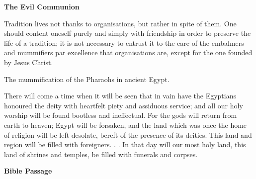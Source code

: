 \textbf{The Evil Communion}

\begin{quotex}
Tradition lives not thanks to organisations, but rather in spite of them. One should content oneself purely and simply with friendship in order to preserve the life of a tradition; it is not necessary to entrust it to the care of the embalmers and mummifiers par excellence that organisations are, except for the one founded by Jesus Christ.

\end{quotex}
The mummification of the Pharaohs in ancient Egypt.

\begin{quotex}
There will come a time when it will be seen that in vain have the Egyptians honoured the deity with heartfelt piety and assiduous service; and all our holy worship will be found bootless and ineffectual. For the gods will return from earth to heaven; Egypt will be forsaken, and the land which was once the home of religion will be left desolate, bereft of the presence of its deities. This land and region will be filled with foreigners. . . In that day will our most holy land, this land of shrines and temples, be filled with funerals and corpses. 

\end{quotex}
\textbf{Bible Passage}

